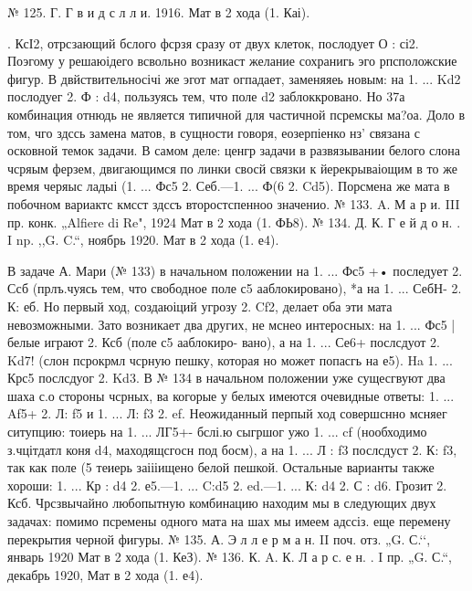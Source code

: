 № 125. Г. Г в и д с л л и.
1916.
Мат в 2 хода (1. Каі).
	

    . КсІ2, отрсзающий бслого фсрзя сразу от двух клеток, послодует
  О	: сі2. Поэгому у решаюідего всвольно возникаст желание сохранигь эго рпсположские фигур. В двйствительносічі же эгот мат огпадает, заменяяеь новым: на 1. ... Kd2 послодуег 2. Ф : d4, пользуясь тем, что поле d2 заблоккровано.
     Но 37а комбинация отнюдь не является типичной для частичной псремскы ма?оа. Доло в том, чго здссь замена матов, в сущности говоря, еозерпіенко нз' связана с осковной темок задачи. В самом деле: ценгр задачи в развязывании белого слона чсряым ферзем, двигающимся по линки свосй связки к йерекрываіощим в то же время черяыс ладыі (1. ... Фс5 2. Себ.—1. ... Ф(6 2. Cd5). Порсмена же мата в побочном вариактс кмсст здссъ второстспенноо значенио.
№ 133. A. М а р и.
    III пр. конк. „Alfiere di Re", 1924
Мат в 2 хода (1. ФЬ8).
	№ 134. Д. К. Г е й д о н. .
 I np. ,,G. C.“, ноябрь 1920.
Мат в 2 хода (1. е4).

    В задаче А. Мари (№ 133) в начальном положении на 1. ... Фс5 +• последует 2. Ссб (прлъ.чуясь тем, что свободное поле с5 ааблокировано), *а на 1. ... СебН- 2. К: еб. Но первый ход, создаюіций угрозу 2. Cf2, делает оба эти мата невозможными. Зато возникает два других, не мснео интеросных: на 1. ... Фс5 | белые играют 2. Ксб (поле с5 ааблокиро- вано), а на 1. ... Се6+ послсдуот 2. Kd7! (слон псрокрмл чсрную пешку, которая но может попасгь на е5). Ha 1. ... Крс5 послсдуог
2. Kd3.
    В № 134 в начальном положении уже сущесгвуют два шаха с.о стороны чсрных, ва когорые у белых имеются очевидные ответы:
1. ... Af5+ 2. Л: f5 и 1. ... Л: f3 2. ef. Неожиданный перпый ход совершснно мсняег ситупцию: тоиерь на 1. ... ЛГ5+- бслі.ю сыгршог ужо 1. ... cf (нообходимо з.чцітдатл коня d4, маходящсгосн под босм), а на 1. ... Л : f3 послсдуст 2. К: f3, так как поле (5 теиерь заіііищено белой пешкой. Остальные варианты также хороши: 1. ... Кр : d4
2. е5.—1. ... C:d5 2. ed.—1. ... К: d4 2. С : d6. Грозит 2. Ксб.
    Чрсзвычайно любопытную комбинацию находим мы в следующих двух задачах: помимо псремены одного мата на шах мы имеем адссіз. еще перемену перекрытия черной фигуры.
№ 135. А. Э л л е р м а н.
II поч. отз. „G. С.‘‘, январь 1920
Мат в 2 хода (1. КеЗ).	№ 136. К. A. К. Л а р с. е н.
. I пр. „G. С.“, декабрь 1920,
Мат в 2 хода (1. е4).


